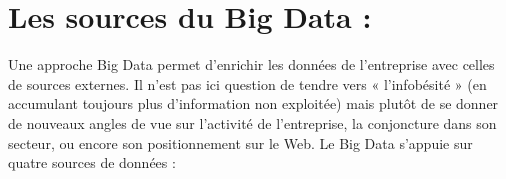\section{Les sources du Big Data :}
Une approche Big Data permet d’enrichir les données de l’entreprise avec celles de sources externes. Il n’est pas ici question de tendre vers « l’infobésité » (en accumulant toujours plus d’information non exploitée) mais plutôt de se donner de nouveaux angles de vue sur l’activité de l’entreprise, la conjoncture dans son secteur, ou encore son positionnement sur le Web. Le Big Data s’appuie sur quatre sources de données : 